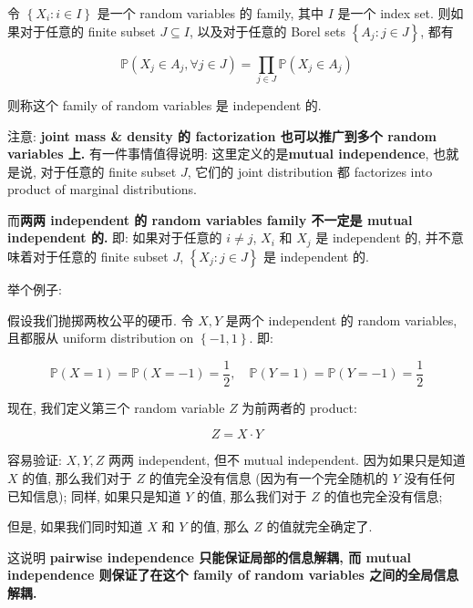 \begin{definition}{}

令 \(\left\{ {\mathit{X}_{\mathit{i}}:\mathit{i} \in \mathit{I}} \right\}\) 是一个 random variables 的 family, 其中 \(\mathit{I}\) 是一个 index set. 则如果对于任意的 finite subset \(\mathit{J} \subseteq \mathit{I}\), 以及对于任意的 Borel sets \(\left\{ {\mathit{A}_{\mathit{j}}:\mathit{j} \in \mathit{J}} \right\}\), 都有

\[\mathbb{P}(\mathit{X}_{\mathit{j}} \in \mathit{A}_{\mathit{j}},\forall\mathit{j} \in \mathit{J}) = \prod\limits_{\mathit{j} \in \mathit{J}}\mathbb{P}(\mathit{X}_{\mathit{j}} \in \mathit{A}_{\mathit{j}})\]

则称这个 family of random variables 是 independent 的.

\end{definition}

注意: \textbf{joint mass \& density 的 factorization 也可以推广到多个 random variables 上.} 有一件事情值得说明: 这里定义的是\textbf{mutual independence}, 也就是说, 对于任意的 finite subset \(\mathit{J}\), 它们的 joint distribution 都 factorizes into product of marginal distributions.

而\textbf{两两 independent 的 random variables family 不一定是 mutual independent 的.} 即: 如果对于任意的 \(\mathit{i} \neq \mathit{j}\), \(\mathit{X}_{\mathit{i}}\) 和 \(\mathit{X}_{\mathit{j}}\) 是 independent 的, 并不意味着对于任意的 finite subset \(\mathit{J}\), \(\left\{ {\mathit{X}_{\mathit{j}}:\mathit{j} \in \mathit{J}} \right\}\) 是 independent 的.

举个例子:

\begin{example}

假设我们抛掷两枚公平的硬币. 令 \(\mathit{X},\mathit{Y}\) 是两个 independent 的 random variables, 且都服从 uniform distribution on \(\left\{ {- 1,1} \right\}\). 即:

\[\mathbb{P}(\mathit{X} = 1) = \mathbb{P}(\mathit{X} = - 1) = \frac{1}{2},\quad\mathbb{P}(\mathit{Y} = 1) = \mathbb{P}(\mathit{Y} = - 1) = \frac{1}{2}\]

现在, 我们定义第三个 random variable \(\mathit{Z}\) 为前两者的 product:

\[\mathit{Z} = \mathit{X} \cdot \mathit{Y}\]

容易验证: \(\mathit{X},\mathit{Y},\mathit{Z}\) 两两 independent, 但不 mutual independent. 因为如果只是知道 \(\mathit{X}\) 的值, 那么我们对于 \(\mathit{Z}\) 的值完全没有信息 (因为有一个完全随机的 \(\mathit{Y}\) 没有任何已知信息); 同样, 如果只是知道 \(\mathit{Y}\) 的值, 那么我们对于 \(\mathit{Z}\) 的值也完全没有信息;

但是, 如果我们同时知道 \(\mathit{X}\) 和 \(\mathit{Y}\) 的值, 那么 \(\mathit{Z}\) 的值就完全确定了.

这说明 \textbf{pairwise independence 只能保证局部的信息解耦, 而 mutual independence 则保证了在这个 family of random variables 之间的全局信息解耦.}

\end{example}

